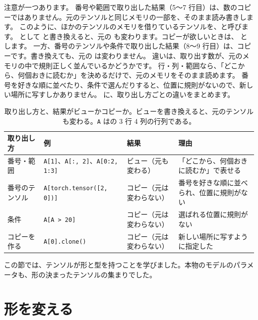 注意が一つあります。
番号や範囲で取り出した結果（5〜7 行目）は、数のコピーではありません。元のテンソルと同じメモリの一部を、そのまま読み書きします。
このように、ほかのテンソルのメモリを借りているテンソルを、と呼びます。
 として  と書き換えると、元の  も変わります。コピーが欲しいときは、 とします。
一方、番号のテンソルや条件で取り出した結果（8〜9 行目）は、コピーです。書き換えても、元の  は変わりません。
違いは、取り出す数が、元のメモリの中で規則正しく並んでいるかどうかです。
行・列・範囲なら、「どこから、何個おきに読むか」を決めるだけで、元のメモリをそのまま読めます。
番号を好きな順に並べたり、条件で選んだりすると、位置に規則がないので、新しい場所に写すしかありません。
に、取り出し方ごとの違いをまとめます。

\begin{table}[tbp]
\centering
\caption{取り出し方と、結果がビューかコピーか。ビューを書き換えると、元のテンソルも変わる。\texttt{A} はの 3 行 4 列の行列である。}
\label{tab:pt-view-copy}
\footnotesize
\begin{tabularx}{\linewidth}{@{}l>{\raggedright\arraybackslash}p{38mm}>{\raggedright\arraybackslash}p{27mm}>{\raggedright\arraybackslash}X@{}}
\toprule
取り出し方 & 例 & 結果 & 理由 \\
\midrule
番号・範囲 & \texttt{A[1]}、\texttt{A[:, 2]}、\texttt{A[0:2, 1:3]} & ビュー（元も変わる） & 「どこから、何個おきに読むか」で表せる \\
番号のテンソル & \texttt{A[torch.tensor([2, 0])]} & コピー（元は変わらない） & 番号を好きな順に並べられ、位置に規則がない \\
条件 & \texttt{A[A > 20]} & コピー（元は変わらない） & 選ばれる位置に規則がない \\
コピーを作る & \texttt{A[0].clone()} & コピー（元は変わらない） & 新しい場所に写すように指定した \\
\bottomrule
\end{tabularx}
\end{table}

この節では、テンソルが形と型を持つことを学びました。本物のモデルのパラメータも、形の決まったテンソルの集まりでした。

\section{形を変える}\label{sec:pt-reshape}

